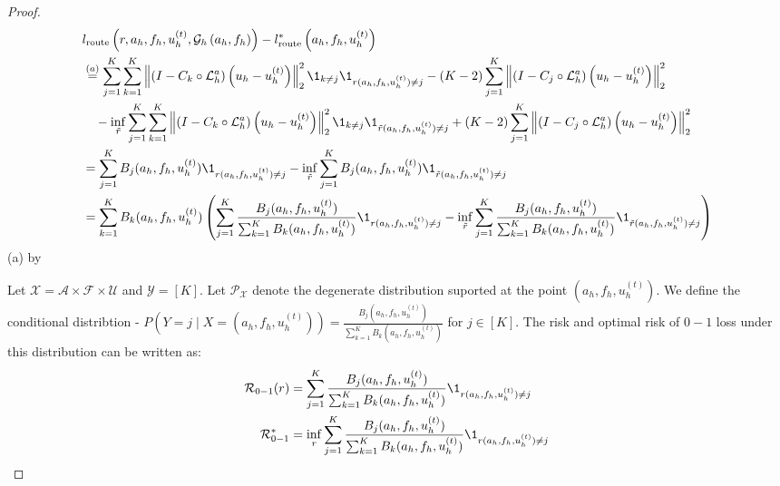 \documentclass{article}
\begin{document}
\begin{proof}
\begin{align*}
    &l_{\text{route}}\left(r, a_h, f_h, u^{(t)}_h, \mathcal{G}_h\left(a_h, f_h\right)\right) - l_{\text{route}}^*\left(a_h, f_h, u^{(t)}_h\right) \\
    &\overset{(a)}{=} \sum_{j = 1}^K\sum_{k = 1}^K\left\|\left( I - C_{k} \circ \mathcal{L}_{h}^a\right)\left(u_h - u^{(t)}_h\right)\right\|^2_2\1_{k\neq j}\1_{r(a_h, f_h, u^{(t)}_h) \neq j}  -\left(K - 2\right)\sum_{j = 1}^K\left\|\left( I - C_{j} \circ \mathcal{L}_{h}^a\right)\left(u_h - u^{(t)}_h\right)\right\|^2_2 \\
    &\quad- \inf_{\Tilde{r}} \sum_{j = 1}^K\sum_{k = 1}^K\left\|\left( I - C_{k} \circ \mathcal{L}_{h}^a\right)\left(u_h - u^{(t)}_h\right)\right\|^2_2\1_{k\neq j}\1_{\tilde{r}(a_h, f_h, u^{(t)}_h) \neq j}  +\left(K - 2\right)\sum_{j = 1}^K\left\|\left( I - C_{j} \circ \mathcal{L}_{h}^a\right)\left(u_h - u^{(t)}_h\right)\right\|^2_2 \\
    &= \sum_{j = 1}^K B_j(a_h, f_h, u^{(t)}_h)\1_{r(a_h, f_h, u^{(t)}_h) \neq j} - \inf_{\Tilde{r}} \sum_{j = 1}^KB_j(a_h, f_h, u^{(t)}_h)\1_{\tilde{r}(a_h, f_h, u^{(t)}_h) \neq j}  \\
    &= \sum_{k = 1}^K B_k(a_h, f_h, u^{(t)}_h)\left(\sum_{j = 1}^K \frac{B_j(a_h, f_h, u^{(t)}_h)}{\sum_{k = 1}^K B_k(a_h, f_h, u^{(t)}_h)}\1_{r(a_h, f_h, u^{(t)}_h) \neq j} - \inf_{\Tilde{r}} \sum_{j = 1}^K \frac{B_j(a_h, f_h, u^{(t)}_h)}{ \sum_{k = 1}^K B_k(a_h, f_h, u^{(t)}_h)}\1_{\tilde{r}(a_h, f_h, u^{(t)}_h) \neq j}\right)
\end{align*}
(a) by 

Let $\mathcal{X} = \mathcal{A} \times \mathcal{F} \times \mathcal{U}$ and $\mathcal{Y} = [K]$. Let $\mathcal{P}_{\mathcal{X}}$ denote the degenerate distribution suported at the point $(a_h, f_h, u_h^{(t)})$. We define the conditional distribtion - $P(Y = j \mid X = (a_h, f_h, u_h^{(t)})) = \frac{B_j(a_h, f_h, u^{(t)}_h)}{ \sum_{k = 1}^K B_k(a_h, f_h, u^{(t)}_h)}$ for $j \in [K]$. The risk and optimal risk of $0-1$ loss under this distribution can be written as:
\begin{align*}
    \mathcal{R}_{0-1}(r) &= \sum_{j = 1}^K \frac{B_j(a_h, f_h, u^{(t)}_h)}{\sum_{k = 1}^K B_k(a_h, f_h, u^{(t)}_h)}\1_{r(a_h, f_h, u^{(t)}_h) \neq j} \\
    \mathcal{R}_{0-1}^* &= \inf_r \sum_{j = 1}^K \frac{B_j(a_h, f_h, u^{(t)}_h)}{\sum_{k = 1}^K B_k(a_h, f_h, u^{(t)}_h)}\1_{r(a_h, f_h, u^{(t)}_h) \neq j} 
\end{align*}


\end{proof}
\end{document}
